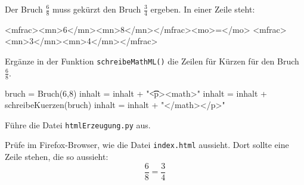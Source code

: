 Der Bruch $\frac{6}{8}$ muss gekürzt den Bruch $\frac{3}{4}$ ergeben. In einer Zeile steht:

\begin{codeHTML}
<mfrac><mn>6</mn><mn>8</mn></mfrac><mo>=</mo>
	<mfrac><mn>3</mn><mn>4</mn></mfrac>
\end{codeHTML}

Ergänze in der Funktion \texttt{schreibeMathML()} die Zeilen für Kürzen für den Bruch $\frac{6}{8}$.

\begin{codePython}
bruch = Bruch(6,8)
inhalt = inhalt + "\n\t\t<p><math>"
inhalt = inhalt + schreibeKuerzen(bruch)
inhalt = inhalt + "</math></p>"
\end{codePython}

Führe die Datei \texttt{htmlErzeugung.py} aus.

Prüfe im Firefox-Browser, wie die Datei \texttt{index.html} aussieht. Dort sollte eine Zeile stehen, die so aussieht:
\[
\frac{6}{8} = \frac{3}{4}
\]
